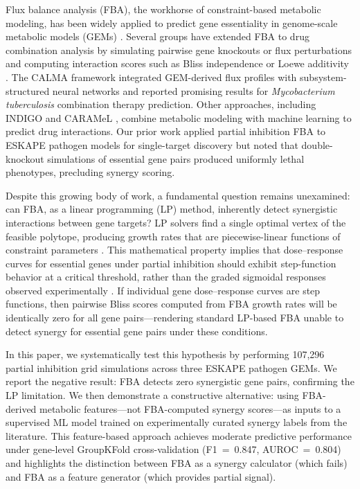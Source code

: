 \documentclass[12pt,a4paper]{article}
\begin{document}
Flux balance analysis (FBA), the workhorse of constraint-based metabolic modeling, has been widely applied to predict gene essentiality in genome-scale metabolic models (GEMs) \citep{orth2010}. Several groups have extended FBA to drug combination analysis by simulating pairwise gene knockouts or flux perturbations and computing interaction scores such as Bliss independence \citep{bliss1939} or Loewe additivity \citep{loewe1953}. The CALMA framework \citep{arora2026} integrated GEM-derived flux profiles with subsystem-structured neural networks and reported promising results for \textit{Mycobacterium tuberculosis} combination therapy prediction. Other approaches, including INDIGO \citep{chandrasekaran2016} and CARAMeL \citep{ji2023}, combine metabolic modeling with machine learning to predict drug interactions. Our prior work \citep{kang2026} applied partial inhibition FBA to ESKAPE pathogen models for single-target discovery but noted that double-knockout simulations of essential gene pairs produced uniformly lethal phenotypes, precluding synergy scoring.

Despite this growing body of work, a fundamental question remains unexamined: can FBA, as a linear programming (LP) method, inherently detect synergistic interactions between gene targets? LP solvers find a single optimal vertex of the feasible polytope, producing growth rates that are piecewise-linear functions of constraint parameters \citep{bertsimas1997}. This mathematical property implies that dose--response curves for essential genes under partial inhibition should exhibit step-function behavior at a critical threshold, rather than the graded sigmoidal responses observed experimentally \citep{bollenbach2009}. If individual gene dose--response curves are step functions, then pairwise Bliss scores computed from FBA growth rates will be identically zero for all gene pairs---rendering standard LP-based FBA unable to detect synergy for essential gene pairs under these conditions.

In this paper, we systematically test this hypothesis by performing 107,296 partial inhibition grid simulations across three ESKAPE pathogen GEMs. We report the negative result: FBA detects zero synergistic gene pairs, confirming the LP limitation. We then demonstrate a constructive alternative: using FBA-derived metabolic features---not FBA-computed synergy scores---as inputs to a supervised ML model trained on experimentally curated synergy labels from the literature. This feature-based approach achieves moderate predictive performance under gene-level GroupKFold cross-validation (F1~=~0.847, AUROC~=~0.804) and highlights the distinction between FBA as a synergy calculator (which fails) and FBA as a feature generator (which provides partial signal).
\end{document}

